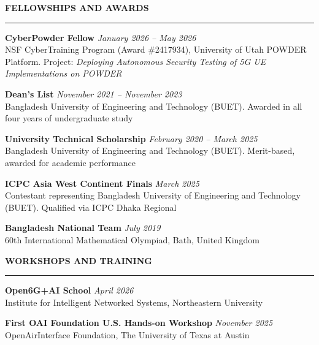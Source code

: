 \documentclass[11pt,letterpaper]{article}
\makeatletter
\def\sectionlineskip{\medskip}%
\def\sectionskip{\medskip}    %
\newcommand{\dates}[1]{\textit{#1}}
\newenvironment{rSection}[1]{%
  \sectionskip
  \MakeUppercase{\bf #1} %
  \par\nobreak            %
  \sectionlineskip
  \nobreak
  \hrule %
  \nobreak
  \@beginparpenalty\@M    %
  \begin{list}{}{%
    \setlength{\leftmargin}{1.5em} %
  }
  \item[]
}{%
  \end{list}
}
\makeatother
\begin{document}
\begin{rSection}{Fellowships and Awards}
\itemsep -3pt

{\textbf{CyberPowder Fellow} \hfill \dates{January 2026 -- May 2026} \\
NSF CyberTraining Program (Award \#2417934), University of Utah POWDER Platform. Project: \textit{Deploying Autonomous Security Testing of 5G UE Implementations on POWDER}}

{\textbf{Dean's List} \hfill \dates{November 2021 -- November 2023} \\
Bangladesh University of Engineering and Technology (BUET). Awarded in all four years of undergraduate study}

{\textbf{University Technical Scholarship} \hfill \dates{February 2020 -- March 2025} \\
Bangladesh University of Engineering and Technology (BUET). Merit-based, awarded for academic performance}

{\textbf{ICPC Asia West Continent Finals} \hfill \dates{March 2025} \\
Contestant representing Bangladesh University of Engineering and Technology (BUET). Qualified via ICPC Dhaka Regional}

{\textbf{Bangladesh National Team} \hfill \dates{July 2019} \\
60th International Mathematical Olympiad, Bath, United Kingdom}

\end{rSection}


\begin{rSection}{Workshops and Training}
\itemsep -3pt

{\textbf{Open6G+AI School} \hfill \dates{April 2026} \\
Institute for Intelligent Networked Systems, Northeastern University}

{\textbf{First OAI Foundation U.S. Hands-on Workshop} \hfill \dates{November 2025} \\
OpenAirInterface Foundation, The University of Texas at Austin}

\end{rSection}

\end{document}
